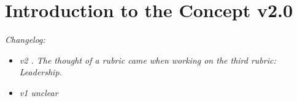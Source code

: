 \chapter{Introduction to the Concept v2.0}
\setcounter{section}{0}


\textit{Changelog:}\\
\begin{itemize}
	\item \textit{v2 \textbf{}. The thought of a rubric came when working on the third rubric: Leadership.}
	\item \textit{v1 unclear}
\end{itemize}
